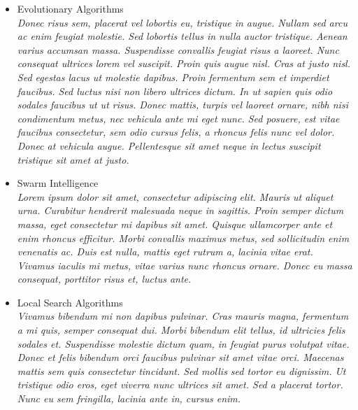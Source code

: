 \documentclass[12pt]{article}
\begin{document}
    \begin{itemize}
        \item Evolutionary Algorithms \\
        
            \textit{Donec risus sem, placerat vel lobortis eu, tristique in augue. Nullam sed arcu ac enim feugiat molestie. Sed lobortis tellus in nulla auctor tristique. Aenean varius accumsan massa. Suspendisse convallis feugiat risus a laoreet. Nunc consequat ultrices lorem vel suscipit. Proin quis augue nisl. Cras at justo nisl. Sed egestas lacus ut molestie dapibus. Proin fermentum sem et imperdiet faucibus. Sed luctus nisi non libero ultrices dictum. In ut sapien quis odio sodales faucibus ut ut risus. Donec mattis, turpis vel laoreet ornare, nibh nisi condimentum metus, nec vehicula ante mi eget nunc. Sed posuere, est vitae faucibus consectetur, sem odio cursus felis, a rhoncus felis nunc vel dolor. Donec at vehicula augue. Pellentesque sit amet neque in lectus suscipit tristique sit amet at justo.} \\
            
        \item Swarm Intelligence \\
        
            \textit{Lorem ipsum dolor sit amet, consectetur adipiscing elit. Mauris ut aliquet urna. Curabitur hendrerit malesuada neque in sagittis. Proin semper dictum massa, eget consectetur mi dapibus sit amet. Quisque ullamcorper ante et enim rhoncus efficitur. Morbi convallis maximus metus, sed sollicitudin enim venenatis ac. Duis est nulla, mattis eget rutrum a, lacinia vitae erat. Vivamus iaculis mi metus, vitae varius nunc rhoncus ornare. Donec eu massa consequat, porttitor risus et, luctus ante.} \\
        
        \item Local Search Algorithms \\
        
            \textit{Vivamus bibendum mi non dapibus pulvinar. Cras mauris magna, fermentum a mi quis, semper consequat dui. Morbi bibendum elit tellus, id ultricies felis sodales et. Suspendisse molestie dictum quam, in feugiat purus volutpat vitae. Donec et felis bibendum orci faucibus pulvinar sit amet vitae orci. Maecenas mattis sem quis consectetur tincidunt. Sed mollis sed tortor eu dignissim. Ut tristique odio eros, eget viverra nunc ultrices sit amet. Sed a placerat tortor. Nunc eu sem fringilla, lacinia ante in, cursus enim.} \\
    

\end{itemize}
\end{document}
